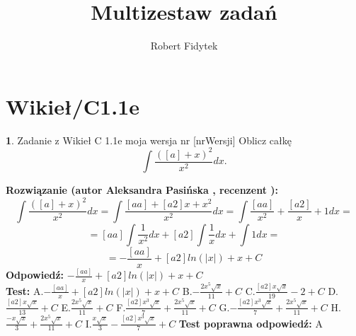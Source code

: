 \documentclass[12pt, a4paper]{article}
\title{Multizestaw zadań}
\author{Robert Fidytek}
\date{}
\theoremstyle{definition} %
\newtheorem{zad}{}
\newcommand{\kategoria}[1]{\section{#1}} %
\newcommand{\zadStart}[1]{\begin{zad}#1\newline} %
\newcommand{\zadStop}{\end{zad}}   %
\newcommand{\rozwStart}[2]{\noindent \textbf{Rozwiązanie (autor #1 , recenzent #2): }\newline} %
\newcommand{\rozwStop}{\newline}                                            %
\newcommand{\odpStart}{\noindent \textbf{Odpowiedź:}\newline}    %
\newcommand{\odpStop}{\newline}                                             %
\newcommand{\testStart}{\noindent \textbf{Test:}\newline} %
\newcommand{\testStop}{\newline} %
\newcommand{\kluczStart}{\noindent \textbf{Test poprawna odpowiedź:}\newline} %
\newcommand{\kluczStop}{\newline} %
\begin{document}
\maketitle


\kategoria{Wikieł/C1.1e}
\zadStart{Zadanie z Wikieł C 1.1e moja wersja nr [nrWersji]}
Oblicz całkę $$\int \frac{([a]+x)^2}{x^2}dx.$$
\zadStop
\rozwStart{Aleksandra Pasińska}{}
$$\int \frac{([a]+x)^2}{x^2}dx=\int \frac{[aa]+[a2]x+x^2}{x^2}dx=\int \frac{[aa]}{x^2}+\frac{[a2]}{x}+1dx=$$
$$=[aa]\int\frac{1}{x^2}dx+[a2]\int\frac{1}{x}dx+\int1dx= $$
$$=-\frac{[aa]}{x}+[a2] ln(|x|)+x+C$$
\rozwStop
\odpStart
$-\frac{[aa]}{x}+[a2] ln(|x|)+x+C$\\
\odpStop
\testStart
A.$-\frac{[aa]}{x}+[a2] ln(|x|)+x+C$
B.$-\frac{2x^5\sqrt{x}}{11}+C$
C.$\frac{[a2]x\sqrt{x}}{19}-2+C$
D.$\frac{[a2]x\sqrt{x}}{13}+C$
E.$\frac{2x^5\sqrt{x}}{11}+C$
F.$\frac{[a2]x^3\sqrt{x}}{7}+\frac{2x^5\sqrt{x}}{11}+C$
G.$-\frac{[a2]x^3\sqrt{x}}{7}+\frac{2x^5\sqrt{x}}{11}+C$
H.$\frac{-x\sqrt{x}}{3}+\frac{2x^5\sqrt{x}}{11}+C$
I.$\frac{x\sqrt{x}}{3}-\frac{[a2]x^3\sqrt{x}}{7}+C$
\testStop
\kluczStart
A
\kluczStop
\end{document}
